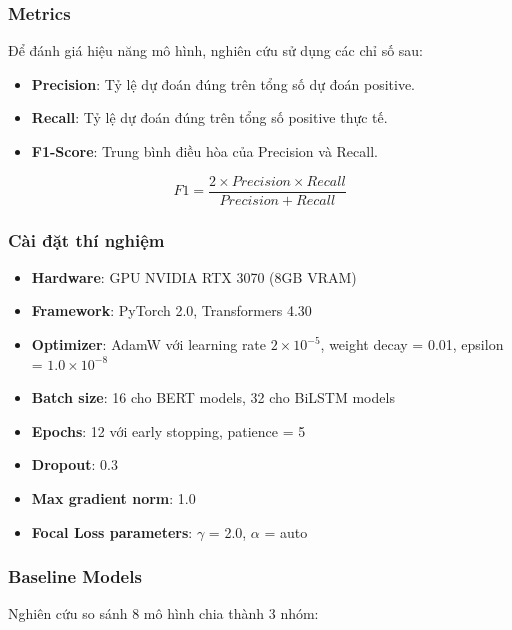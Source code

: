 \subsubsection{Metrics}
Để đánh giá hiệu năng mô hình, nghiên cứu sử dụng các chỉ số sau:
\begin{itemize}
    \item \textbf{Precision}: Tỷ lệ dự đoán đúng trên tổng số dự đoán positive.
    \item \textbf{Recall}: Tỷ lệ dự đoán đúng trên tổng số positive thực tế.
    \item \textbf{F1-Score}: Trung bình điều hòa của Precision và Recall.
\end{itemize}

\begin{equation}
F1 = \frac{2 \times Precision \times Recall}{Precision + Recall}
\end{equation}

\subsubsection{Cài đặt thí nghiệm}
\begin{itemize}
    \item \textbf{Hardware}: GPU NVIDIA RTX 3070 (8GB VRAM)
    \item \textbf{Framework}: PyTorch 2.0, Transformers 4.30
    \item \textbf{Optimizer}: AdamW với learning rate $2 \times 10^{-5}$, weight decay = 0.01, epsilon = $1.0 \times 10^{-8}$
    \item \textbf{Batch size}: 16 cho BERT models, 32 cho BiLSTM models
    \item \textbf{Epochs}: 12 với early stopping, patience = 5
    \item \textbf{Dropout}: 0.3
    \item \textbf{Max gradient norm}: 1.0
    \item \textbf{Focal Loss parameters}: $\gamma$ = 2.0, $\alpha$ = auto
\end{itemize}

\subsubsection{Baseline Models}
Nghiên cứu so sánh 8 mô hình chia thành 3 nhóm:

